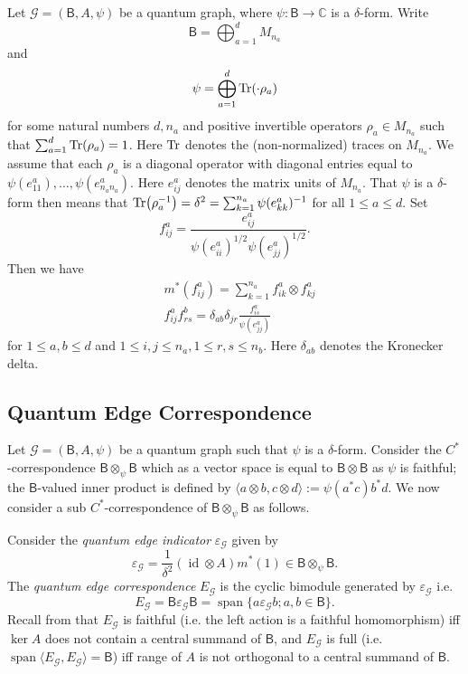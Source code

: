 \documentclass[a4paper,reqno]{amsart}
\numberwithin{equation}{section}
\numberwithin{theorem}{section}
\theoremstyle{definition}\newtheorem{definition}[theorem]{Definition}
\theoremstyle{definition}\newtheorem{remark}[theorem]{Remark}
\theoremstyle{definition}\newtheorem{example}[theorem]{Example}
\theoremstyle{definition}\newtheorem*{notation*}{Notation}
\theoremstyle{definition}\newtheorem*{convention*}{Convention}
\theoremstyle{definition}\newtheorem{observation}{Observation}
\theoremstyle{definition}\newtheorem*{acknowledgment*}{Acknowledgments}
\newcommand{\C}{\mathbb{C}}
\newcommand{\B}{\mathsf{B}}
\newcommand{\G}{\mathcal{G}}
\newcommand{\cst}{C^*}
\DeclareMathOperator{\Span}{span}
\DeclareMathOperator{\id}{id}
\begin{document}
Let $\G=(\B, A, \psi)$ be a quantum graph, where $\psi:\B\to\C$ is  a $\delta$-form. Write 
\[\B=\bigoplus_{a=1}^dM_{n_a}\] 
and 
\[\psi=\bigoplus_{a=1}^d\Tr(\cdot\rho_a)\] for some natural numbers $d, n_a$ and positive invertible operators $\rho_a\in M_{n_a}$ such that $\sum_{a=1}^d\Tr(\rho_a)=1$. Here $\Tr$ denotes the (non-normalized) traces on $M_{n_a}$. We assume that each $\rho_a$ is a diagonal operator with diagonal entries equal to $\psi(e_{11}^a), \ldots, \psi(e_{n_an_a}^a)$. Here $e_{ij}^a$ denotes the matrix units of $M_{n_a}$. That $\psi$ is a $\delta$-form then means that $\Tr(\rho_a^{-1})=\delta^2=\sum_{k=1}^{n_a}\psi(e_{kk}^a)^{-1}$ for all $1\leq a\leq d.$ Set
\[f_{ij}^a=\frac{e_{ij}^a}{\psi(e_{ii}^a)^{1/2}\psi(e_{jj}^a)^{1/2}}.\]
Then we have
\begin{align*}
    &m^*(f_{ij}^a)=\sum_{k=1}^{n_a}f_{ik}^a\otimes f_{kj}^a\\
    & f_{ij}^af_{rs}^b=\delta_{ab}\delta_{jr}\frac{f_{is}^a}{\psi(e_{jj}^a)}
\end{align*}
for $1\leq a,b\leq d$ and $1\leq i,j\leq n_a, 1\leq r,s\leq n_b$. Here $\delta_{ab}$ denotes the Kronecker delta.

\subsection{Quantum Edge Correspondence} Let $\G=(\B, A, \psi)$ be a quantum graph such that $\psi$ is a $\delta$-form. Consider the $\cst$-correspondence $\B\otimes_\psi\B$ which as a vector space is equal to $\B\otimes\B$ as $\psi$ is faithful; the $\B$-valued inner product is defined by $\langle a\otimes b, c\otimes d\rangle:= \psi(a^{\ast}c)b^{\ast} d$. We now consider a sub $\cst$-correspondence of $\B\otimes_\psi\B$ as follows.

Consider the {\em quantum edge indicator} $\varepsilon_\G$ given by 
\[\varepsilon_\G=\frac{1}{\delta^2}(\id \otimes A)m^*(1)\in \B\otimes_\psi\B.\]
The {\em quantum edge correspondence} $E_\G$ is the cyclic bimodule generated by $\varepsilon_\G$ i.e.
\[E_\G=\B\varepsilon_\G\B=\Span\{a\varepsilon_\G b; a,b\in \B\}.\]
Recall from \cite[Theorem 2.9]{BHINW} that $E_\G$ is faithful (i.e. the left action is a faithful homomorphism) iff $\ker A$ does not contain a central summand of $\B$, and $E_\G$ is full (i.e.  $\Span\langle E_\G,E_\G\rangle=\B$) iff range of $A$ is not orthogonal to a central summand of $\B$.
\end{document}
